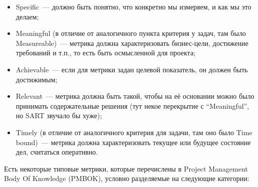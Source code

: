 \documentclass{../../text-style}
\begin{document}
\begin{itemize}
    \item Specific~--- должно быть понятно, что конкретно мы измеряем, и как мы это делаем;
    \item Meaningful (в отличие от аналогичного пункта критерия у задач, там было Measureable)~--- метрика должна характеризовать бизнес-цели, достижение требований и т.п., то есть быть осмысленной для проекта;
    \item Achievable~--- если для метрики задан целевой показатель, он должен быть достижимым;
    \item Relevant~--- метрика должна быть такой, чтобы на её основании можно было принимать содержательные решения (тут некое перекрытие с \enquote{Meaningful}, но SART звучало бы хуже);
    \item Timely (в отличие от аналогичного критерия для задачи, там оно было Time bound)~--- метрика должна характеризовать текущее или будущее состояние дел, считаться оперативно.
\end{itemize}

Есть некоторые типовые метрики, которые перечислены в Project Management Body Of Knowledge (PMBOK), условно разделяемые на следующие категории:
\end{document}
